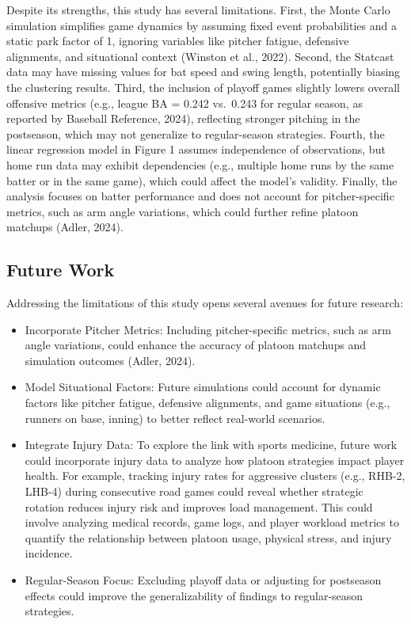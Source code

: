 \documentclass[
]{article}
\providecommand{\tightlist}{%
  \setlength{\itemsep}{0pt}\setlength{\parskip}{0pt}}
\begin{document}
Despite its strengths, this study has several limitations. First, the
Monte Carlo simulation simplifies game dynamics by assuming fixed event
probabilities and a static park factor of 1, ignoring variables like
pitcher fatigue, defensive alignments, and situational context (Winston
et al., 2022). Second, the Statcast data may have missing values for bat
speed and swing length, potentially biasing the clustering results.
Third, the inclusion of playoff games slightly lowers overall offensive
metrics (e.g., league BA = 0.242 vs.~0.243 for regular season, as
reported by Baseball Reference, 2024), reflecting stronger pitching in
the postseason, which may not generalize to regular-season strategies.
Fourth, the linear regression model in Figure 1 assumes independence of
observations, but home run data may exhibit dependencies (e.g., multiple
home runs by the same batter or in the same game), which could affect
the model's validity. Finally, the analysis focuses on batter
performance and does not account for pitcher-specific metrics, such as
arm angle variations, which could further refine platoon matchups
(Adler, 2024).

\hypertarget{future-work}{%
\subsection{Future Work}\label{future-work}}

Addressing the limitations of this study opens several avenues for
future research:

\begin{itemize}
\tightlist
\item
  Incorporate Pitcher Metrics: Including pitcher-specific metrics, such
  as arm angle variations, could enhance the accuracy of platoon
  matchups and simulation outcomes (Adler, 2024).
\item
  Model Situational Factors: Future simulations could account for
  dynamic factors like pitcher fatigue, defensive alignments, and game
  situations (e.g., runners on base, inning) to better reflect
  real-world scenarios.
\item
  Integrate Injury Data: To explore the link with sports medicine,
  future work could incorporate injury data to analyze how platoon
  strategies impact player health. For example, tracking injury rates
  for aggressive clusters (e.g., RHB-2, LHB-4) during consecutive road
  games could reveal whether strategic rotation reduces injury risk and
  improves load management. This could involve analyzing medical
  records, game logs, and player workload metrics to quantify the
  relationship between platoon usage, physical stress, and injury
  incidence.
\item
  Regular-Season Focus: Excluding playoff data or adjusting for
  postseason effects could improve the generalizability of findings to
  regular-season strategies.
\end{itemize}
\end{document}
